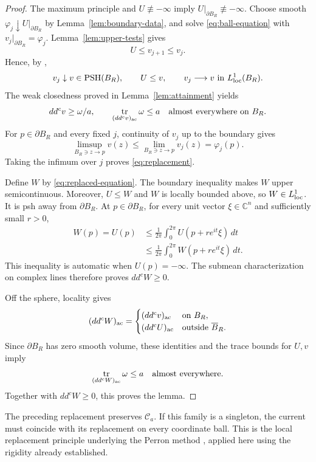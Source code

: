 \documentclass[reqno]{amsart}
\numberwithin{equation}{section}
\theoremstyle{definition}
\DeclareMathOperator{\tr}{tr}
\begin{document}
\begin{proof}

The maximum principle and $U\not\equiv-\infty$ imply
$U|_{\partial B_R}\not\equiv-\infty$.
Choose smooth $\varphi_j\downarrow U|_{\partial B_R}$ by
Lemma~\ref{lem:boundary-data}, and solve
\eqref{eq:ball-equation} with
$v_j|_{\partial B_R}=\varphi_j$.
Lemma~\ref{lem:upper-tests} gives
\[
U\le v_{j+1}\le v_j.
\]
Hence, by \cite[Chapter I, theorem 5.4]{D12},
\[
v_j\downarrow v\in\operatorname{PSH}(B_R),\qquad
U\le v,\qquad v_j\longrightarrow v\text{ in }L^1_{\rm loc}(B_R).
\]
The weak closedness proved in
Lemma~\ref{lem:attainment} yields
\[
dd^cv\ge\omega/a,\qquad
\tr_{(dd^cv)_{\rm ac}}\omega\le a
\quad\text{almost everywhere on }B_R.
\]
For $p\in\partial B_R$ and every fixed $j$, continuity of
$v_j$ up to the boundary gives
\[
\limsup_{B_R\ni z\to p}v(z)
\le\lim_{B_R\ni z\to p}v_j(z)=\varphi_j(p).
\]
Taking the infimum over $j$ proves
\eqref{eq:replacement}.

Define $W$ by \eqref{eq:replaced-equation}.
The boundary inequality makes $W$ upper semicontinuous.
Moreover, $U\le W$ and $W$ is locally bounded above, so
$W\in L^1_{\rm loc}$.
It is psh away from $\partial B_R$.
At $p\in\partial B_R$, for every unit vector
$\xi\in\mathbb C^n$ and sufficiently small $r>0$,
\[
\begin{aligned}
W(p)=U(p)
&\le\frac1{2\pi}\int_0^{2\pi}U(p+re^{it}\xi)\,dt\\
&\le\frac1{2\pi}\int_0^{2\pi}W(p+re^{it}\xi)\,dt.
\end{aligned}
\]
This inequality is automatic when $U(p)=-\infty$.
The submean characterization on complex lines therefore
proves $dd^cW\ge0$.

Off the sphere, locality gives
\[
(dd^cW)_{\rm ac}=
\begin{cases}
(dd^cv)_{\rm ac}&\text{on }B_R,\\
(dd^cU)_{\rm ac}&\text{outside }\overline B_R.
\end{cases}
\]
Since $\partial B_R$ has zero smooth volume, these identities
and the trace bounds for $U,v$ imply
\[
\tr_{(dd^cW)_{\rm ac}}\omega\le a
\quad\text{almost everywhere}.
\]
Together with $dd^cW\ge0$, this proves the lemma.
\end{proof}
The preceding replacement preserves $\mathcal C_a$.
If this family is a singleton, the current must coincide
with its replacement on every coordinate ball. This is
the local replacement principle underlying the
Perron method \cite{BT76}, applied here using the rigidity
already established.
\end{document}
